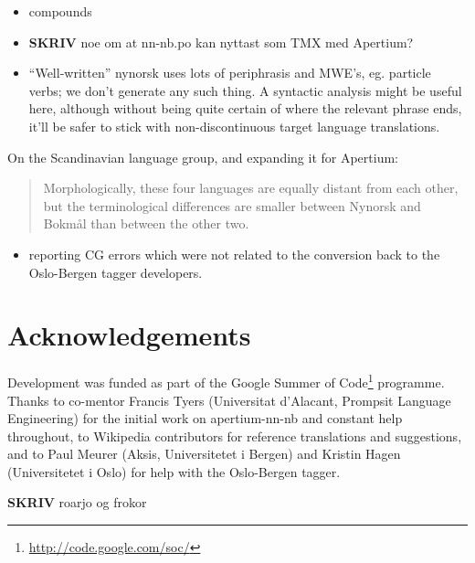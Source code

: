 \documentclass[11pt]{article}
\begin{document}
\begin{itemize}
\item compounds
\item \textbf{SKRIV} noe om at nn-nb.po kan nyttast som TMX med Apertium?
\item ``Well-written'' nynorsk uses lots of periphrasis and MWE's, eg. particle
  verbs; we don't generate any such thing. A syntactic analysis might
  be useful here, although without being quite certain of where the
  relevant phrase ends, it'll be safer to stick with non-discontinuous
  target language translations.
\end{itemize}
On the Scandinavian language group, and expanding it for Apertium:
\begin{quote}
Morphologically, these four languages are equally distant from each
other, but the terminological differences are smaller between Nynorsk
and Bokmål than between the other two. \\
\citep{everson2000sln}
\end{quote}

\begin{itemize} \item reporting CG errors which were not
  related
  to the conversion back to the Oslo-Bergen tagger developers.
\end{itemize} 

\section*{Acknowledgements}

Development was funded as part of the Google Summer of
Code\footnote{\href{http://code.google.com/soc/}{http://code.google.com/soc/}
} programme. Thanks to co-mentor Francis Tyers (Universitat d'Alacant,
Prompsit Language Engineering) for the initial work on apertium-nn-nb
and constant help throughout, to Wikipedia contributors for reference
translations and suggestions, and to Paul Meurer (Aksis, Universitetet
i Bergen) and Kristin Hagen (Universitetet i Oslo) for help with the
Oslo-Bergen tagger.

\textbf{SKRIV} roarjo og frokor




\end{document}
